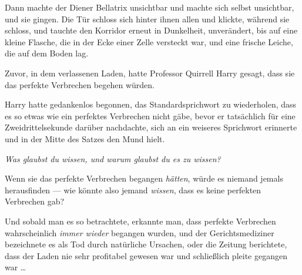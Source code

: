 Dann machte der Diener Bellatrix unsichtbar und machte sich selbst unsichtbar, und sie gingen. Die Tür schloss sich hinter ihnen allen und klickte, während sie schloss, und tauchte den Korridor erneut in Dunkelheit, unverändert, bis auf eine kleine Flasche, die in der Ecke einer Zelle versteckt war, und eine frische Leiche, die auf dem Boden lag.

\later

Zuvor, in dem verlassenen Laden, hatte Professor Quirrell Harry gesagt, dass sie das perfekte Verbrechen begehen würden.

Harry hatte gedankenlos begonnen, das Standardsprichwort zu wiederholen, dass es so etwas wie ein perfektes Verbrechen nicht gäbe, bevor er tatsächlich für eine Zweidrittelsekunde darüber nachdachte, sich an ein weiseres Sprichwort erinnerte und in der Mitte des Satzes den Mund hielt.

\emph{Was glaubst du wissen, und warum glaubst du es zu wissen?}

Wenn sie das perfekte Verbrechen begangen \emph{hätten}, würde es niemand jemals herausfinden — wie könnte also jemand \emph{wissen}, dass es keine perfekten Verbrechen gab?

Und sobald man es so betrachtete, erkannte man, dass perfekte Verbrechen wahrscheinlich \emph{immer wieder} begangen wurden, und der Gerichtsmediziner bezeichnete es als Tod durch natürliche Ursachen, oder die Zeitung berichtete, dass der Laden nie sehr profitabel gewesen war und schließlich pleite gegangen war …


